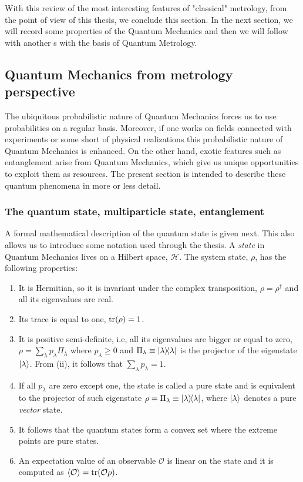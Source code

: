 With this review of the most interesting features of "classical" metrology, from the point of view of this thesis, we conclude this section.
In the next section, we will record some properties of the Quantum Mechanics and then we will follow with another s with the basis of Quantum Metrology.

\subsection{Quantum Mechanics from metrology perspective}
\label{sec:bg-quantum-mechanics-for-metrology}

The ubiquitous probabilistic nature of Quantum Mechanics forces us to use probabilities on a regular basis.
Moreover, if one works on fields connected with experiments or some short of physical realizations this probabilistic nature of Quantum Mechanics is enhanced.
On the other hand, exotic features such as entanglement arise from Quantum Mechanics, which give us unique opportunities to exploit them as resources.
The present section is intended to describe these quantum phenomena in more or less detail.

\subsubsection{The quantum state, multiparticle state, entanglement}

A formal mathematical description of the quantum state is given next.
This also allows us to introduce some notation used through the thesis.
A \emph{state} in Quantum Mechanics lives on a Hilbert space, $\mathcal{H}$.
The system state, $\rho$, has the following properties:
\begin{enumerate}
  \item
  It is Hermitian, so it is invariant under the complex transposition, $\rho=\rho^\dagger$ and all its eigenvalues are real.
  \item Its trace is equal to one, $\operatorname{tr}(\rho)=1$.
  \item It is positive semi-definite, i.e, all its eigenvalues are bigger or equal to zero, $\rho=\sum_{\lambda}p_\lambda \Pi_\lambda$ where $p_\lambda\geq 0$ and $\Pi_\lambda\equiv\vert \lambda \rangle \! \langle \lambda \vert$ is the projector of the eigenstate $\vert \lambda \rangle$.
  From (ii), it follows that $\sum_\lambda p_\lambda = 1$.
  \item If all $p_\lambda$ are zero except one, the state is called a pure state and is equivalent to the projector of such eigenstate $\rho=\Pi_\lambda\equiv\vert \lambda \rangle \! \langle \lambda \vert$, where $\vert \lambda \rangle$ denotes a pure \emph{vector} state.
  \item It follows that the quantum states form a convex set where the extreme points are pure states.
  \item An expectation value of an observable $\mathcal{O}$ is linear on the state and it is computed as $\langle \mathcal{O} \rangle=\operatorname{tr}(\mathcal{O}\rho)$.
\end{enumerate}

